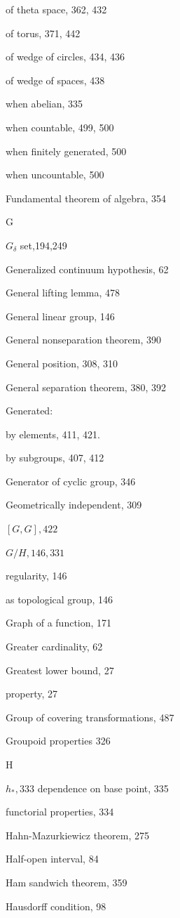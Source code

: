 of theta space, 362, 432

of torus, 371, 442

of wedge of circles, 434, 436

of wedge of spaces, 438

when abelian, 335

when countable, 499, 500

when finitely generated, 500

when uncountable, 500

Fundamental theorem of algebra, 354

G

\({G}_{\delta }\) set,194,249

Generalized continuum hypothesis, 62

General lifting lemma, 478

General linear group, 146

General nonseparation theorem, 390

General position, 308, 310

General separation theorem, 380, 392

Generated:

by elements, 411, 421.

by subgroups, 407, 412

Generator of cyclic group, 346

Geometrically independent, 309

\(\left\lbrack  {G,G}\right\rbrack  ,{422}\)

\(G/H,{146},{331}\)

regularity, 146

as topological group, 146

Graph of a function, 171

Greater cardinality, 62

Greatest lower bound, 27

property, 27

Group of covering transformations, 487

Groupoid properties 326

H

\({h}_{ * },{333}\) dependence on base point, 335

functorial properties, 334

Hahn-Mazurkiewicz theorem, 275

Half-open interval, 84

Ham sandwich theorem, 359

Hausdorff condition, 98

